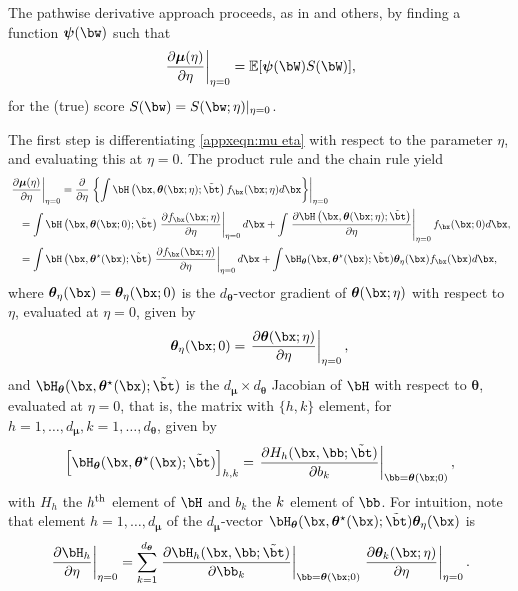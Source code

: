 \documentclass[12pt]{article}
\numberwithin{equation}{section}
\theoremstyle{definition}
\newcommand{\E}{\mathbb{E}}
\newcommand{\bmu}{\boldsymbol{\mu}}
\newcommand{\btheta}{\boldsymbol{\theta}}
\newcommand{\bpsi}{\boldsymbol{\psi}}
\newcommand{\bttrue}{\btheta^\star}
\newcommand{\btstar}{\tilde{\bt}}
\newcommand{\dmu}{d_{\bmu}}  %
\newcommand{\dtheta}{d_{\btheta}}  %
\begin{document}
\begin{appendices}
The pathwise derivative approach proceeds, as in \cite{Newey1994_Ecma} and others, by finding a function $\bpsi(\bw)$ such that 
\begin{equation}
	\label{appxeqn:pathwise}
	\left. \frac{\partial \bmu(\eta)}{\partial \eta} \right\vert_{\eta=0} = \E[ \bpsi(\bW) S(\bW)],
\end{equation}
for the (true) score $S(\bw) = S(\bw ; \eta)\vert_{\eta=0}$. 

The first step is differentiating \eqref{appxeqn:mu eta} with respect to the parameter $\eta$, and evaluating this at $\eta = 0$. The product rule and the chain rule yield
\begin{align}
	& \left. \frac{\partial \bmu(\eta)}{\partial \eta} \right\vert_{\eta=0}  = \frac{\partial }{\partial \eta} \left.\left\{ \int \bH\left(\bx, \btheta(\bx;\eta); \btstar\right) f_{\bx}(\bx ; \eta) d\bx \right\} \right\vert_{\eta=0}   			\nonumber \\
	& \quad   =    \int \bH\left(\bx, \btheta(\bx ; 0); \btstar\right) \left. \frac{\partial f_{\bx}(\bx; \eta)}{\partial \eta} \right\vert_{\eta=0} d\bx   +    \int \left. \frac{\partial\bH\left(\bx, \btheta(\bx;\eta); \btstar\right)}{\partial \eta} \right\vert_{\eta=0} f_{\bx}(\bx ; 0) d\bx ,   			\nonumber \\
	& \quad   =    \int \bH\left(\bx, \bttrue(\bx); \btstar\right) \left. \frac{\partial f_{\bx}(\bx; \eta)}{\partial \eta} \right\vert_{\eta=0} d\bx   +    \int  \bH_{\btheta}(\bx, \bttrue(\bx ); \btstar) \btheta_{\eta}(\bx) f_{\bx}(\bx ) d\bx ,   			\label{appxeqn:chain rule}
\end{align}
where $\btheta_{\eta}(\bx) = \btheta_{\eta}(\bx ;0)$ is the $\dtheta$-vector gradient of $\btheta(\bx;\eta)$ with respect to $\eta$, evaluated at $\eta=0$, given by
\[
	\btheta_{\eta}(\bx ;0) = \left.\frac{\partial \btheta(\bx;\eta)}{\partial \eta} \right\vert_{\eta=0},
\]
and $\bH_{\btheta}(\bx, \bttrue(\bx ); \btstar)$ is the $\dmu \times \dtheta$ Jacobian of $\bH$ with respect to $\btheta$, evaluated at $\eta=0$, that is, the matrix with $\{h,k\}$ element, for $h = 1, \ldots, \dmu, k = 1, \ldots, \dtheta$, given by
\[
	\Big[ \bH_{\btheta}(\bx, \bttrue(\bx ); \btstar) \Big]_{h,k} = \left. \frac{\partial H_h (\bx, \bb; \btstar)}{\partial b_k}  \right\vert_{\bb = \btheta(\bx ; 0)},
\]
with $H_h$ the $h^{\rm th}$ element of $\bH$ and $b_k$ the $k^{\rm }$ element of $\bb$. For intuition, note that element $h = 1, \ldots, \dmu$ of the $\dmu$-vector $\bH_{\btheta}(\bx, \bttrue(\bx ); \btstar) \btheta_{\eta}(\bx)$ is 
\[
    \left.\frac{\partial \bH_h}{\partial \eta}\right\vert_{\eta=0} = \sum_{k = 1}^{\dtheta} \left. \frac{\partial \bH_h (\bx, \bb; \btstar)}{\partial \bb_k}  \right\vert_{\bb = \btheta(\bx ; 0)} \left.\frac{\partial \btheta_k(\bx ;\eta)}{\partial \eta} \right\vert_{\eta=0}.
\]



\end{appendices}
\end{document}
